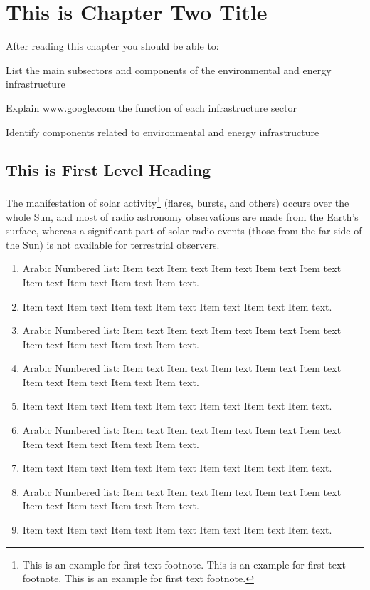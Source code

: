 \bgroup

\chapter{This is Chapter Two Title}

After reading this chapter you should be able to:

\begin{objectives}
\item List the main subsectors and components of the environmental and energy infrastructure

\item Explain \url{www.google.com} the function of each infrastructure sector

\item Identify components related to environmental and energy infrastructure
\end{objectives}

\section{This is First Level Heading}

\lipsum[1-2]

The manifestation of solar activity\footnote{This is an example for first text footnote. This is an example for first text footnote. This is an example for first text footnote.} (flares, bursts, and others) occurs over the whole Sun, and most of radio astronomy observations are made from the Earth's surface, whereas a significant part of solar radio events (those from the far side of the Sun) is not available for terrestrial observers.
\begin{enumerate}[1.]
\item Arabic Numbered list: Item text  Item text  Item text  Item text  Item text  
Item text Item text Item text  Item text. 
\item Item text  Item text  Item text  Item text  Item text  Item text  Item text.
\item Arabic Numbered list: Item text  Item text  Item text  Item text  Item text  
Item text Item text Item text  Item text. 
\item Arabic Numbered list: Item text  Item text  Item text  Item text  Item text  
Item text Item text Item text  Item text. 
\item Item text  Item text  Item text  Item text  Item text  Item text  Item text.
\item Arabic Numbered list: Item text  Item text  Item text  Item text  Item text  
Item text Item text Item text  Item text. 
\item Item text  Item text  Item text  Item text  Item text  Item text  Item text.
\item Arabic Numbered list: Item text  Item text  Item text  Item text  Item text 
Item text Item text Item text  Item text. 
\item Item text  Item text  Item text  Item text  Item text  Item text  Item text.
\end{enumerate}

